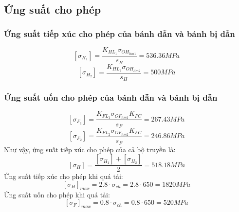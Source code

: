 \subsection{Ứng suất cho phép}
\subsubsection{Ứng suất tiếp xúc cho phép của bánh dẫn và bánh bị dẫn}
\[
    [\sigma_{H_1}] = \frac{K_{HL_1}\sigma_{OH_{lim1}}}{s_H} = 536.36MPa
\]
\[
    [\sigma_{H_2}] = \frac{K_{HL_2}\sigma_{OH_{lim2}}}{s_H} = 500MPa
\]
\subsubsection{Ứng suất uốn cho phép của bánh dẫn và bánh bị dẫn}
\[
    [\sigma_{F_1}] = \frac{K_{FL_1}\sigma_{OF_{lim1}}K_{FC}}{s_F} = 267.43MPa
\]
\[
    [\sigma_{F_2}] = \frac{K_{FL_2}\sigma_{OF_{lim2}}K_{FC}}{s_F} = 246.86MPa
\]
Như vậy, ứng suất tiếp xúc cho phép của cả bộ truyền là:
\[
    [\sigma_H] = \frac{[\sigma_{H_1}] + [\sigma_{H_2}]}{2} = 518.18MPa 
\]
Ứng suất tiếp xúc cho phép khi quá tải:
\[
    [\sigma_H]_{max} = 2.8 \cdot \sigma_{ch} = 2.8 \cdot 650 = 1820MPa
\]
Ứng suất uốn cho phép khi quá tải:
\[
    [\sigma_F]_{max} = 0.8 \cdot \sigma_{ch} = 0.8 \cdot 650 = 520MPa
\]
